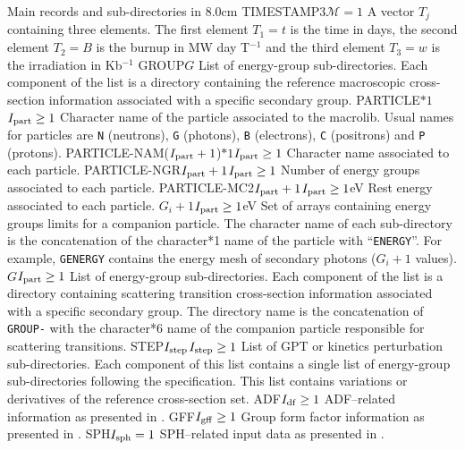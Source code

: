 \begin{DescriptionEnregistrement}{Main records and sub-directories in }{8.0cm}
\OptRealEnr
  {TIMESTAMP}{$3$}{$\mathcal{M}=1$}{}
  {A vector $T_{j}$ containing three elements. The first element $T_{1}=t$ is the time in days, the
   second element $T_{2}=B$ is the burnup in MW day T$^{-1}$ and the third element $T_{3}=w$ is the 
   irradiation in Kb$^{-1}$}
\DirlEnr
  {GROUP}{$G$}
  {List of energy-group sub-directories. Each component of the list is a directory containing
  the reference macroscopic cross-section information associated with a specific secondary group.}
\OptCharEnr
  {PARTICLE}{$*1$}{$I_{\rm part}\ge 1$} 
  {Character name of the particle associated to the macrolib. Usual names for
  particles are {\tt N} (neutrons), {\tt G} (photons), {\tt B} (electrons),
  {\tt C} (positrons) and {\tt P} (protons).}
\OptCharEnr
  {PARTICLE-NAM}{($I_{\rm part}+1$)$*1$}{$I_{\rm part}\ge 1$} 
  {Character name associated to each particle.}
\OptIntEnr
  {PARTICLE-NGR}{$I_{\rm part}+1$}{$I_{\rm part}\ge 1$}
  {Number of energy groups associated to each particle.}
\OptRealEnr
  {PARTICLE-MC2}{$I_{\rm part}+1$}{$I_{\rm part}\ge 1$}{eV}
  {Rest energy associated to each particle.}
\OptRealVar
  {}{$G_i+1$}{$I_{\rm part}\ge 1$}{eV}
  {Set of arrays containing energy groups limits for a companion particle. The character name
  of each sub-directory is the concatenation of the character*1 name of the particle with ``{\tt ENERGY}''.
  For example, {\tt GENERGY} contains the energy mesh of secondary photons ($G_i+1$ values).}
\OptDirlVar
  {}{$G$}{$I_{\rm part}\ge 1$} 
  {List of energy-group sub-directories. Each component of the list is a directory containing
  scattering transition cross-section information associated with a specific secondary group.
  The directory  name is the concatenation of {\tt GROUP-} with the character*6
  name of the companion particle responsible for scattering transitions.}
\OptDirlEnr
  {STEP}{$I_{\rm step}$}{$I_{\rm step}\ge 1$} 
  {List of GPT or kinetics perturbation sub-directories. Each component of
  this list contains a single 
  list of energy-group sub-directories following the  specification.
  This  list contains variations or derivatives of the reference cross-section set.}
\OptDirEnr
  {ADF}{$I_{\rm df} \ge 1$}
  {ADF--related information as presented in .}
\OptDirEnr
  {GFF}{$I_{\rm gff} \ge 1$}
  {Group form factor information as presented in .}
\OptDirEnr
  {SPH}{$I_{\rm sph} = 1$}
  {SPH--related input data as presented in .}
\end{DescriptionEnregistrement}

